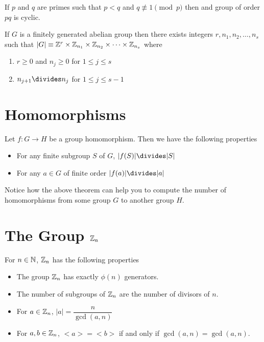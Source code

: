 \begin{theorem}
	If $p$ and $q$ are primes such that $p<q$ and $q\not\equiv 1\pmod p$ then and group of order $pq$ is cyclic.
\end{theorem}

\begin{theorem}
	If $G$ is a finitely generated abelian group then there exists integers $r,n_1,n_2,\dots,n_s$ such that $|G|\equiv \mathbb{Z}^r\times \mathbb{Z}_{n_1}\times \mathbb{Z}_{n_2}\times\cdots\times \mathbb{Z}_{n_s}$ where
		\begin{enumerate}
			\item 
			$r\geq 0$ and $n_j\geq 0$ for $1\leq j\leq s$
			\item 
			$n_{j+1}\divides n_j$ for $1\leq j\leq s-1$		
		\end{enumerate}
\end{theorem}

\section{Homomorphisms}

\begin{theorem}
	Let $f:G\rightarrow H$ be a group homomorphism. Then we have the following properties
	\begin{itemize}
		\item 
		For any finite subgroup $S$ of $G$, $|f(S)|\divides |S|$
		\item 
		For any $a\in G$ of finite order $|f(a)|\divides |a|$
	\end{itemize}
\end{theorem}

\begin{remark}
	Notice how the above theorem can help you to compute the number of homomorphisms from some group $G$ to another group $H$.
\end{remark}

\section{The Group $\mathbb{Z}_n$}
\begin{theorem}
	For $n\in \mathbb{N}$, $\mathbb{Z}_n$ has the following properties
	\begin{itemize}
		\item 
		The group $\mathbb{Z}_n$ has exactly $\phi(n)$ generators.
		\item 
		The number of subgroups of $\mathbb{Z}_n$ are the number of divisors of $n$. 
		\item 
		For $a\in \mathbb{Z}_n$, $|a|=\dfrac{n}{\gcd(a,n)}$
		\item 
		For $a,b\in \mathbb{Z}_n$, $<a>=<b>$ if and only if $\gcd(a,n)=\gcd(a,n)$.
	\end{itemize}
\end{theorem}

